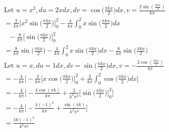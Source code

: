 \documentclass{article}
\begin{document}
\begin{enumerate}
\begin{multicols}{2}
\begin{align*}
			&\text{Let $u = x^2, du = 2xdx, dv = \cos\Big(\frac{\pi kx}{2}\Big) dx, v = \frac{2\sin(\frac{\pi kx}{2})}{k\pi}$} \\
            &= \frac{2}{k\pi}\Big[x^2 \sin\Big(\frac{\pi kx}{2}\Big)\Big]^{2}_{0} - \frac{4}{k\pi}\int^{2}_{0}x\sin\Big(\frac{\pi kx}{2}\Big)dx  \\
            & \:\:\: -\frac{8}{k \pi}\Big[\sin\Big(\frac{\pi kx}{2}\Big)\Big]^{2}_{0}\\
            &= \frac{8}{k \pi}\sin\Big(\frac{\pi kx}{2}\Big) - \frac{4}{k\pi}\int^{2}_{0}x\sin\Big(\frac{\pi kx}{2}\Big)dx - \frac{8}{k \pi}\sin\Big(\frac{\pi kx}{2}\Big)\\
			&\text{Let $u = x, du = 1 dx, dv = \sin\Big(\frac{\pi kx}{2}\Big) dx, v = -\frac{2\cos(\frac{\pi kx}{2})}{k\pi}$} \\
            &= - \frac{4}{k\pi}\Bigg[-\frac{2}{k\pi}\Big[x\cos\Big(\frac{\pi kx}{2}\Big)\Big]^{2}_{0} + \frac{2}{k\pi}\int^{2}_{0}\cos\Big(\frac{\pi kx}{2}\Big) dx\Bigg] \\
            &= - \frac{4}{k\pi}\Bigg[-\frac{4\cos(\pi k)}{k\pi} + \frac{2}{k^2\pi^2}\Big[\sin\Big(\frac{\pi kx}{2}\Big) \Big]^{2}_{0} \Bigg]\\
            &= - \frac{4}{k\pi}\Bigg[-\frac{4(-1)^k}{k\pi} + \frac{\sin(\pi k)}{k^2\pi^2} \Bigg]\\
            &=  \frac{16(-1)^k}{k^2\pi^2}
    \end{align*}
    \end{multicols}
    

\end{enumerate}
\end{document}
